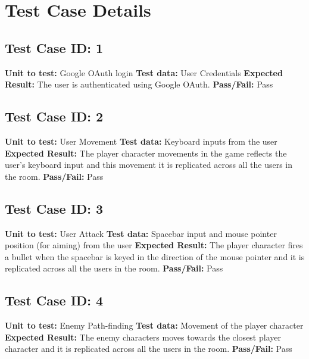 \documentclass[oneside,12pt]{Classes/VTU}
\begin{document}
		\section{Test Case Details}
			\subsection{Test Case ID: 1}
				\textbf{Unit to test: }Google OAuth login
				\newline
				\textbf{Test data: }User Credentials
				\newline
				\textbf{Expected Result: }The user is authenticated using Google OAuth. 
				\newline
				\textbf{Pass/Fail: }Pass
		
			\subsection{Test Case ID: 2}
				\textbf{Unit to test: }User Movement
				\newline
				\textbf{Test data: }Keyboard inputs from the user
				\newline
				\textbf{Expected Result: }The player character movements in the game reflects the user's keyboard input and this movement it is replicated across all the users in the room. 
				\newline
				\textbf{Pass/Fail: }Pass
				
			\subsection{Test Case ID: 3}
				\textbf{Unit to test: }User Attack
				\newline
				\textbf{Test data: }Spacebar input and mouse pointer position (for aiming) from the user
				\newline
				\textbf{Expected Result: }The player character fires a bullet when the spacebar is keyed in the direction of the mouse pointer and it is replicated across all the users in the room. 
				\newline
				\textbf{Pass/Fail: }Pass
				
			\subsection{Test Case ID: 4}
				\textbf{Unit to test: }Enemy Path-finding
				\newline
				\textbf{Test data: }Movement of the player character
				\newline
				\textbf{Expected Result: }The enemy characters moves towards the closest player character and it is replicated across all the users in the room. 
				\newline
				\textbf{Pass/Fail: }Pass
				
\end{document}
